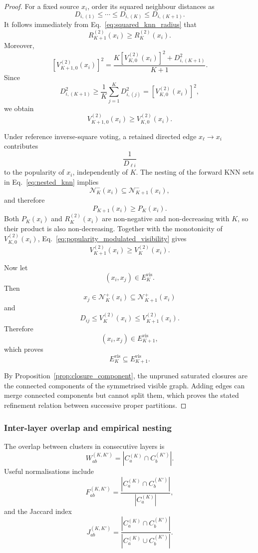\documentclass[review,12pt]{elsarticle}
\newcommand{\calN}{\mathcal{N}}
\begin{document}
\begin{proof}
For a fixed source $x_i$, order its squared neighbour distances as
\[
D_{i,(1)}
\leq
\cdots
\leq
D_{i,(K)}
\leq
D_{i,(K+1)}.
\]
It follows immediately from Eq.~\eqref{eq:squared_knn_radius} that
\[
R_{K+1}^{(2)}(x_i)
\geq
R_K^{(2)}(x_i).
\]
Moreover,
\[
\left[V_{K+1,0}^{(2)}(x_i)\right]^2
=
\frac{
K\left[V_{K,0}^{(2)}(x_i)\right]^2
+
D_{i,(K+1)}^2
}{K+1}.
\]
Since
\[
D_{i,(K+1)}^2
\geq
\frac{1}{K}
\sum_{j=1}^{K}D_{i,(j)}^2
=
\left[V_{K,0}^{(2)}(x_i)\right]^2,
\]
we obtain
\[
V_{K+1,0}^{(2)}(x_i)
\geq
V_{K,0}^{(2)}(x_i).
\]

Under reference inverse-square voting, a retained directed edge
$x_\ell\to x_i$ contributes
\[
\frac{1}{D_{\ell i}}
\]
to the popularity of $x_i$, independently of $K$. The nesting of the
forward KNN sets in Eq.~\eqref{eq:nested_knn} implies
\[
\calN_K^-(x_i)
\subseteq
\calN_{K+1}^-(x_i),
\]
and therefore
\[
P_{K+1}(x_i)\geq P_K(x_i).
\]
Both $P_K(x_i)$ and $R_K^{(2)}(x_i)$ are non-negative and non-decreasing
with $K$, so their product is also non-decreasing. Together with the
monotonicity of $V_{K,0}^{(2)}(x_i)$,
Eq.~\eqref{eq:popularity_modulated_visibility} gives
\[
V_{K+1}^{(2)}(x_i)
\geq
V_K^{(2)}(x_i).
\]

Now let
\[
(x_i,x_j)\in E_K^{\mathrm{vis}}.
\]
Then
\[
x_j\in\calN_K^+(x_i)
\subseteq
\calN_{K+1}^+(x_i)
\]
and
\[
D_{ij}
\leq
V_K^{(2)}(x_i)
\leq
V_{K+1}^{(2)}(x_i).
\]
Therefore
\[
(x_i,x_j)\in E_{K+1}^{\mathrm{vis}},
\]
which proves
\[
E_K^{\mathrm{vis}}
\subseteq
E_{K+1}^{\mathrm{vis}}.
\]

By Proposition~\ref{prop:closure_component}, the unpruned saturated closures
are the connected components of the symmetrised visible graph. Adding edges
can merge connected components but cannot split them, which proves the stated
refinement relation between successive proper partitions.
\end{proof}


\subsubsection{Inter-layer overlap and empirical nesting}

The overlap between clusters in consecutive layers is
\begin{equation}
W_{ab}^{(K,K')}
=
|C_a^{(K)}\cap C_b^{(K')}|.
\label{eq:overlap_count}
\end{equation}
Useful normalisations include
\begin{equation}
F_{ab}^{(K,K')}
=
\frac{
|C_a^{(K)}\cap C_b^{(K')}|
}{
|C_a^{(K)}|
},
\label{eq:frac_from}
\end{equation}
and the Jaccard index
\begin{equation}
J_{ab}^{(K,K')}
=
\frac{
|C_a^{(K)}\cap C_b^{(K')}|
}{
|C_a^{(K)}\cup C_b^{(K')}|
}.
\label{eq:jaccard}
\end{equation}
\end{document}
